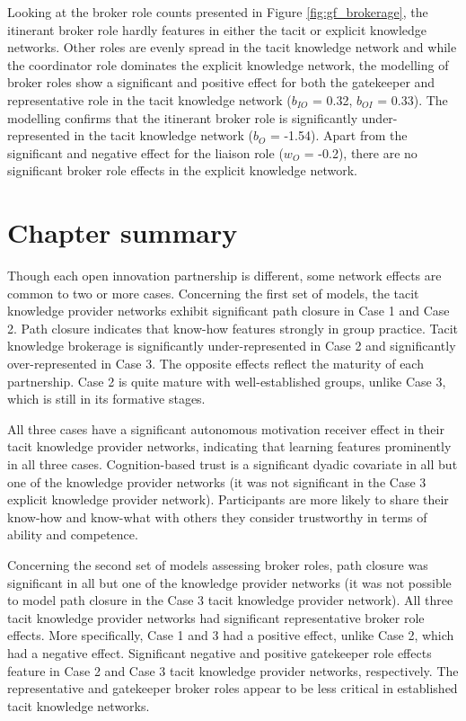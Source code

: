 Looking at the broker role counts presented in Figure \ref{fig:gf_brokerage}, the itinerant broker role hardly features in either the tacit or explicit knowledge networks. Other roles are evenly spread in the tacit knowledge network and while the coordinator role dominates the explicit knowledge network, the modelling of broker roles show a significant and positive effect for both the gatekeeper and representative role in the tacit knowledge network ($b_{IO}$ = 0.32, $b_{OI}$ = 0.33). The modelling confirms that the itinerant broker role is significantly under-represented in the tacit knowledge network ($b_O$ = -1.54). Apart from the significant and negative effect for the liaison role ($w_O$ = -0.2), there are no significant broker role effects in the explicit knowledge network. \medskip  

\section{Chapter summary}

Though each open innovation partnership is different, some network effects are common to two or more cases. Concerning the first set of models, the tacit knowledge provider networks exhibit significant path closure in Case 1 and Case 2. Path closure indicates that know-how features strongly in group practice. Tacit knowledge brokerage is significantly under-represented in Case 2 and significantly over-represented in Case 3. The opposite effects reflect the maturity of each partnership. Case 2 is quite mature with well-established groups, unlike Case 3, which is still in its formative stages. \medskip

All three cases have a significant autonomous motivation receiver effect in their tacit knowledge provider networks, indicating that learning features prominently in all three cases. Cognition-based trust is a significant dyadic covariate in all but one of the knowledge provider networks (it was not significant in the Case 3 explicit knowledge provider network). Participants are more likely to share their know-how and know-what with others they consider trustworthy in terms of ability and competence. \medskip

Concerning the second set of models assessing broker roles, path closure was significant in all but one of the knowledge provider networks (it was not possible to model path closure in the Case 3 tacit knowledge provider network). All three tacit knowledge provider networks had significant representative broker role effects. More specifically, Case 1 and 3 had a positive effect, unlike Case 2, which had a negative effect. Significant negative and positive gatekeeper role effects feature in Case 2 and Case 3 tacit knowledge provider networks, respectively. The representative and gatekeeper broker roles appear to be less critical in established tacit knowledge networks. \medskip

